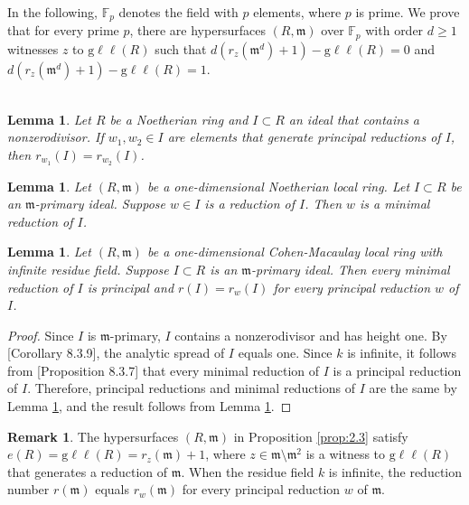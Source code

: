 \documentclass{amsart}
\newtheorem{lemma}[theorem]{Lemma}
\theoremstyle{definition}
\theoremstyle{definition}
\newtheorem{remark}[theorem]{Remark}
\numberwithin{equation}{section}
\theoremstyle{definition}
\begin{document}
{In the following, $\mathbb{F}_p$ denotes the field with $p$ elements, where $p$ is prime. We prove that for every prime $p$, there are hypersurfaces $(R,\mathfrak{m})$ over $\mathbb{F}_p$ with order $d \geq 1$ witnesses $z$ to $\text{g}\ell\ell(R)$ such that $d(r_{z}(\mathfrak{m}^d)+1)-\text{g}\ell\ell(R)=0$ and $d(r_{z}(\mathfrak{m}^d)+1)-\text{g}\ell\ell(R)=1$.\text{}\\\\
\begin{lemma}\cite[section 2]{D'Anna01}\label{lemma:2.2.1}
Let $R$ be a Noetherian ring and $I \subset R$ an ideal that contains a nonzerodivisor. If $w_1, w_2 \in I$ are elements that generate principal reductions of $I$, then $r_{w_1}(I)=r_{w_2}(I)$.
\end{lemma} 
\text{}
\begin{lemma}\cite[Corollaries 8.3.6, 8.3.9]{HS06}\label{lemma:2.1.1}
Let $(R,\mathfrak{m})$ be a one-dimensional Noetherian local ring. Let $I \subset R$ be an $\mathfrak{m}$-primary ideal. Suppose $w \in I$ is a reduction of $I$. Then $w$ is a minimal reduction of $I$.
\end{lemma}
\text{}
\begin{lemma}\label{lemma:2.3}
Let $(R,\mathfrak{m})$ be a one-dimensional Cohen-Macaulay local ring with infinite residue field. Suppose $I \subset R$ is an $\mathfrak{m}$-primary ideal. Then every minimal reduction of $I$ is principal and $r(I)=r_{w}(I)$ for every principal reduction $w$ of $I$.
\end{lemma}
\text{}
\begin{proof}
Since $I$ is $\mathfrak{m}$-primary, $I$ contains a nonzerodivisor and has height one. By \cite{HS06}[Corollary 8.3.9], the analytic spread of $I$ equals one. Since $k$ is infinite, it follows from \cite{HS06}[Proposition 8.3.7] that every minimal reduction of $I$ is a principal reduction of $I$. Therefore, principal reductions and minimal reductions of $I$ are the same by Lemma \ref{lemma:2.1.1}, and the result follows from Lemma \ref{lemma:2.2.1}.
\end{proof}
\text{}
\begin{remark}
The hypersurfaces $(R,\mathfrak{m})$ in Proposition \ref{prop:2.3} satisfy $e(R)=\text{g}\ell\ell(R)=r_{z}(\mathfrak{m}) + 1$, where $z \in \mathfrak{m}\setminus \mathfrak{m}^2$ is a witness to $\text{g}\ell\ell(R)$ that generates a reduction of $\mathfrak{m}$. When the residue field $k$ is infinite, the reduction number $r(\mathfrak{m})$ equals $r_{w}(\mathfrak{m})$ for every principal reduction $w$ of $\mathfrak{m}$.

\end{remark}}
\end{document}
